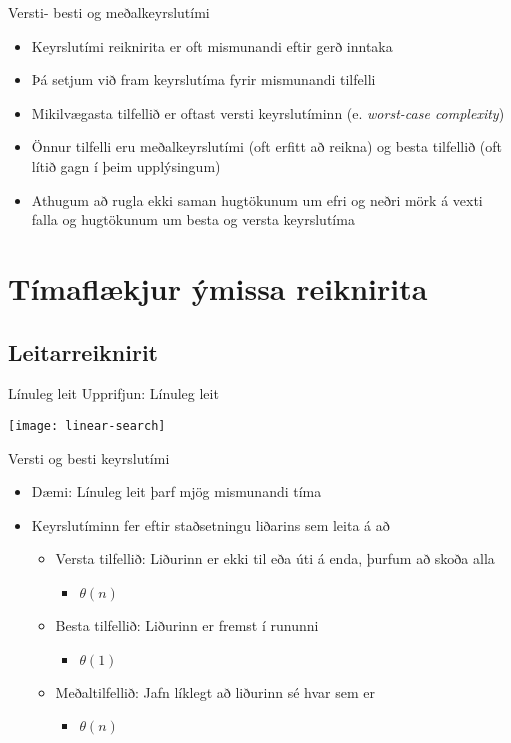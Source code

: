 \documentclass[handout]{beamer}
\begin{document}
\begin{frame}{Versti- besti og meðalkeyrslutími}
\begin{itemize}
 \item Keyrslutími reiknirita er oft mismunandi eftir gerð inntaka
 \item Þá setjum við fram keyrslutíma fyrir mismunandi tilfelli
 \item Mikilvægasta tilfellið er oftast versti keyrslutíminn (e. \emph{worst-case complexity})
 \item Önnur tilfelli eru meðalkeyrslutími (oft erfitt að reikna) og besta tilfellið (oft lítið gagn í þeim upplýsingum)
 \item Athugum að rugla ekki saman hugtökunum um efri og neðri mörk á vexti falla og hugtökunum um besta og versta keyrslutíma
\end{itemize}
\end{frame}

\section{Tímaflækjur ýmissa reiknirita}

\subsection{Leitarreiknirit}

\begin{frame}{Línuleg leit}
Upprifjun: Línuleg leit

\begin{center}
\texttt{[image: linear-search]}
\end{center}
\end{frame}

\begin{frame}{Versti og besti keyrslutími}
\begin{itemize}
 \item Dæmi: Línuleg leit þarf mjög mismunandi tíma
 \item Keyrslutíminn fer eftir staðsetningu liðarins sem leita á að
 \begin{itemize}
  \item Versta tilfellið: Liðurinn er ekki til eða úti á enda, þurfum að skoða alla \pause
  \begin{itemize}
   \item $\theta(n)$
  \end{itemize}
  \item Besta tilfellið: Liðurinn er fremst í rununni \pause
  \begin{itemize}
   \item $\theta(1)$
  \end{itemize}
  \item Meðaltilfellið: Jafn líklegt að liðurinn sé hvar sem er \pause
  \begin{itemize}
   \item $\theta(n)$
  \end{itemize}
 \end{itemize}
\end{itemize}
\end{frame}
\end{document}
